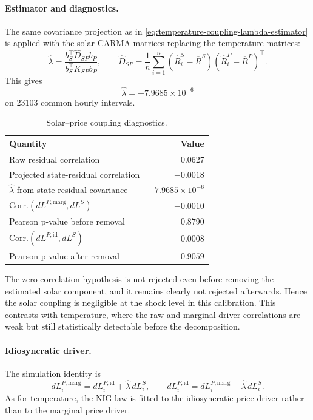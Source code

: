 \paragraph{Estimator and diagnostics.}
The same covariance projection as in
\cref{eq:temperature-coupling-lambda-estimator} is applied with the solar CARMA
matrices replacing the temperature matrices:
\begin{equation}
  \widehat\lambda
  =
  \frac{b_S^\top \widehat D_{SP} b_P}
       {b_S^\top K_{SP} b_P},
  \qquad
  \widehat D_{SP}
  =
  \frac{1}{n}\sum_{i=1}^{n}
  (\widehat R_i^S-\overline R^S)
  (\widehat R_i^P-\overline R^P)^\top .
  \label{eq:solar-coupling-lambda-estimator}
\end{equation}
This gives
\[
  \widehat\lambda = -7.9685\times 10^{-6}
\]
on \(23103\) common hourly intervals.

\begin{table}[H]
  \centering
  \caption{Solar--price coupling diagnostics.}
  \label{tab:solar-price-coupling-diagnostics}
  \begin{tabular}{@{}lr@{}}
    \toprule
    Quantity & Value \\
    \midrule
    Raw residual correlation & \(0.0627\) \\
    Projected state-residual correlation & \(-0.0018\) \\
    \(\widehat\lambda\) from state-residual covariance & \(-7.9685{\times}10^{-6}\) \\
    Corr.\((dL^{P,\mathrm{marg}},dL^S)\) & \(-0.0010\) \\
    Pearson p-value before removal & \(0.8790\) \\
    Corr.\((dL^{P,\mathrm{id}},dL^S)\) & \(0.0008\) \\
    Pearson p-value after removal & \(0.9059\) \\
    \bottomrule
  \end{tabular}
\end{table}

The zero-correlation hypothesis is not rejected even before removing the
estimated solar component, and it remains clearly not rejected afterwards. Hence
the solar coupling is negligible at the shock level in this calibration. This
contrasts with temperature, where the raw and marginal-driver correlations are
weak but still statistically detectable before the decomposition.

\paragraph{Idiosyncratic driver.}
The simulation identity is
\begin{equation}
  dL_i^{P,\mathrm{marg}}
  =
  dL_i^{P,\mathrm{id}}
  +
  \widehat\lambda\,dL_i^S,
  \qquad
  dL_i^{P,\mathrm{id}}
  =
  dL_i^{P,\mathrm{marg}}
  -
  \widehat\lambda\,dL_i^S .
  \label{eq:solar-coupling-driver-decomposition}
\end{equation}
As for temperature, the NIG law is fitted to the idiosyncratic price driver
rather than to the marginal price driver.

